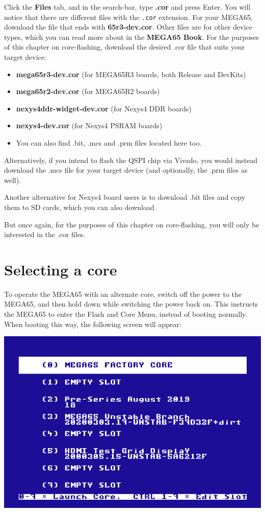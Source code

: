 Click the {\bf Files} tab, and in the search-bar, type {\bf .cor} and press Enter.
\ifdefined\printmanual
  You will notice that there are different files with the {\tt .cor} extension. For your MEGA65, download the file
  that ends with {\bf 65r3-dev.cor}. Other files are for other device types, which you can read more about in the
  {\bf MEGA65 Book}.
\else
  For the purposes of this chapter on core-flashing, download the desired .cor file that suits your target device:

  \begin{itemize}
    \item{\textbf{mega65r3-dev.cor} (for MEGA65R3 boards, both Release and DevKits)}
    \item{\textbf{mega65r2-dev.cor} (for MEGA65R2 boards)}
    \item{\textbf{nexys4ddr-widget-dev.cor} (for Nexys4 DDR boards)}
    \item{\textbf{nexys4-dev.cor} (for Nexys4 PSRAM boards)}
    \item{You can also find .bit, .mcs and .prm files located here too.}
  \end{itemize}

  Alternatively, if you intend to flash the QSPI chip via Vivado, you would instead download the .mcs file for your target device (and optionally, the .prm files as well).

  Another alternative for Nexys4 board users is to download .bit files and copy them to SD cards, which you can also download.

  But once again, for the purposes of this chapter on core-flashing, you will only be interested in the .cor files.
\fi

\section{Selecting a core}

To operate the MEGA65 with an alternate core, switch off the power to the MEGA65, and then hold
 down while switching the power back on. This instructs the MEGA65 to enter the
Flash and Core Menu, instead of booting normally. When booting this way, the following screen will appear:

\begin{center}
\includegraphics[trim= 0  0 0 10mm,clip,width=0.7\linewidth]{images/ss-flashmenu.png}
\end{center}

